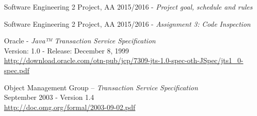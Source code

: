 \begin{thebibliography}{1}
    	Software Engineering 2 Project, AA 2015/2016 - \emph{Project goal, schedule and rules}

    	Software Engineering 2 Project, AA 2015/2016 - \emph{Assignment 3: Code Inspection}

    Oracle - \emph{Java™ Transaction Service Specification}\\
    Version: 1.0 - Release: December 8, 1999\\
    \url{http://download.oracle.com/otn-pub/jcp/7309-jts-1.0-spec-oth-JSpec/jts1_0-spec.pdf}

    Object Management Group –
    \emph{Transaction Service Specification}\\
    September 2003 - Version 1.4\\
    \url{http://doc.omg.org/formal/2003-09-02.pdf}
\end{thebibliography}

